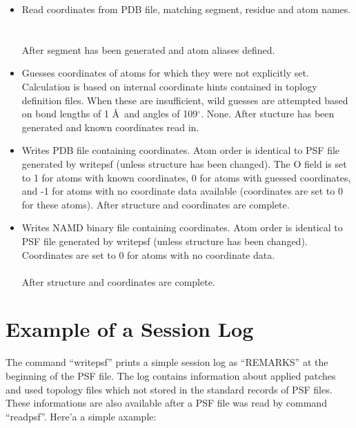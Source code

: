 \begin{itemize}
\item {}
{Read coordinates from PDB file, matching segment, residue and atom names.}
{\\
\\
\\
}
{After segment has been generated and atom aliases defined.}

\item {}
{Guesses coordinates of atoms for which they were not explicitly set.
Calculation is based on internal coordinate hints contained in toplogy
definition files.  When these are insufficient, wild guesses are attempted
based on bond lengths of 1 \AA\ and angles of 109$^\circ$.}
{None.}
{After stucture has been generated and known coordinates read in.}

\item {}
{Writes PDB file containing coordinates.  Atom order is identical to
PSF file generated by writepsf (unless structure has been changed).
The O field is set to 1 for atoms with known coordinates, 0 for atoms
with guessed coordinates, and -1 for atoms with no coordinate data
available (coordinates are set to 0 for these atoms).}
{}
{After structure and coordinates are complete.}

\item {}
{Writes NAMD binary file containing coordinates.  Atom order is identical to
PSF file generated by writepsf (unless structure has been changed).
Coordinates are set to 0 for atoms with no coordinate data.}
{\\
\\
}
{After structure and coordinates are complete.}

\end{itemize}

\section{Example of a Session Log}
The command  ``writepsf'' prints a simple session log as ``REMARKS'' 
at the beginning of the PSF file. The log contains information about applied patches 
and used topology files which not stored in the standard records of PSF files.
These informations are also available after a PSF file was read by command ``readpsf''.
Here'a a simple axample:

